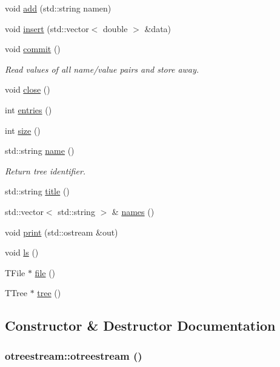 \begin{CompactItemize}
\item 
void \hyperlink{classotreestream_a13}{add} (std::string namen)
\item 
void \hyperlink{classotreestream_a14}{insert} (std::vector$<$ double $>$ \&data)
\item 
void \hyperlink{classotreestream_a15}{commit} ()
\begin{CompactList}\small\item\em Read values of all name/value pairs and store away. \item\end{CompactList}\item 
void \hyperlink{classotreestream_a16}{close} ()
\item 
int \hyperlink{classotreestream_a17}{entries} ()
\item 
int \hyperlink{classotreestream_a18}{size} ()
\item 
std::string \hyperlink{classotreestream_a19}{name} ()
\begin{CompactList}\small\item\em Return tree identifier. \item\end{CompactList}\item 
std::string \hyperlink{classotreestream_a20}{title} ()
\item 
std::vector$<$ std::string $>$ \& \hyperlink{classotreestream_a21}{names} ()
\item 
void \hyperlink{classotreestream_a22}{print} (std::ostream \&out)
\item 
void \hyperlink{classotreestream_a23}{ls} ()
\item 
TFile $\ast$ \hyperlink{classotreestream_a24}{file} ()
\item 
TTree $\ast$ \hyperlink{classotreestream_a25}{tree} ()
\end{CompactItemize}


\subsection{Constructor \& Destructor Documentation}
\hypertarget{classotreestream_a0}{
\subsubsection[otreestream]{\setlength{\rightskip}{0pt plus 5cm}otreestream::otreestream ()}}
\label{classotreestream_a0}


